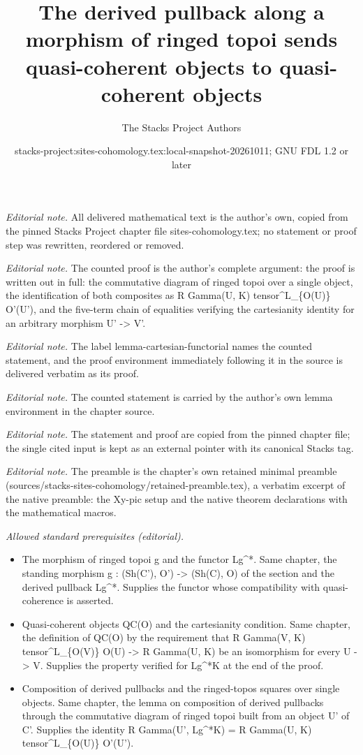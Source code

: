 \documentclass[10pt,a4paper]{amsart}
\title{The derived pullback along a morphism of ringed topoi sends quasi-coherent objects to quasi-coherent objects}
\author{The Stacks Project Authors}
\date{stacks-project:sites-cohomology.tex:local-snapshot-20261011; GNU FDL 1.2 or later}
\theoremstyle{plain}
\theoremstyle{definition}
\theoremstyle{remark}
\numberwithin{equation}{subsection}
\begin{document}
\maketitle
\noindent\textit{Editorial note.} All delivered mathematical text is the author's own, copied from the pinned Stacks Project chapter file sites-cohomology.tex; no statement or proof step was rewritten, reordered or removed.\par\medskip
\noindent\textit{Editorial note.} The counted proof is the author's complete argument: the proof is written out in full: the commutative diagram of ringed topoi over a single object, the identification of both composites as R Gamma(U, K) tensor\textasciicircum{}L\_\{O(U)\} O'(U'), and the five-term chain of equalities verifying the cartesianity identity for an arbitrary morphism U' -> V'.\par\medskip
\noindent\textit{Editorial note.} The label lemma-cartesian-functorial names the counted statement, and the proof environment immediately following it in the source is delivered verbatim as its proof.\par\medskip
\noindent\textit{Editorial note.} The counted statement is carried by the author's own lemma environment in the chapter source.\par\medskip
\noindent\textit{Editorial note.} The statement and proof are copied from the pinned chapter file; the single cited input is kept as an external pointer with its canonical Stacks tag.\par\medskip
\noindent\textit{Editorial note.} The preamble is the chapter's own retained minimal preamble (sources/stacks-sites-cohomology/retained-preamble.tex), a verbatim excerpt of the native preamble: the Xy-pic setup and the native theorem declarations with the mathematical macros.\par\medskip
\noindent\textit{Allowed standard prerequisites (editorial).}\begin{itemize}
\item The morphism of ringed topoi g and the functor Lg\textasciicircum{}*. Same chapter, the standing morphism g : (Sh(C'), O') -> (Sh(C), O) of the section and the derived pullback Lg\textasciicircum{}*. Supplies the functor whose compatibility with quasi-coherence is asserted.
\item Quasi-coherent objects QC(O) and the cartesianity condition. Same chapter, the definition of QC(O) by the requirement that R Gamma(V, K) tensor\textasciicircum{}L\_\{O(V)\} O(U) -> R Gamma(U, K) be an isomorphism for every U -> V. Supplies the property verified for Lg\textasciicircum{}*K at the end of the proof.
\item Composition of derived pullbacks and the ringed-topos squares over single objects. Same chapter, the lemma on composition of derived pullbacks through the commutative diagram of ringed topoi built from an object U' of C'. Supplies the identity R Gamma(U', Lg\textasciicircum{}*K) = R Gamma(U, K) tensor\textasciicircum{}L\_\{O(U)\} O'(U').
\end{itemize}\medskip
\end{document}
